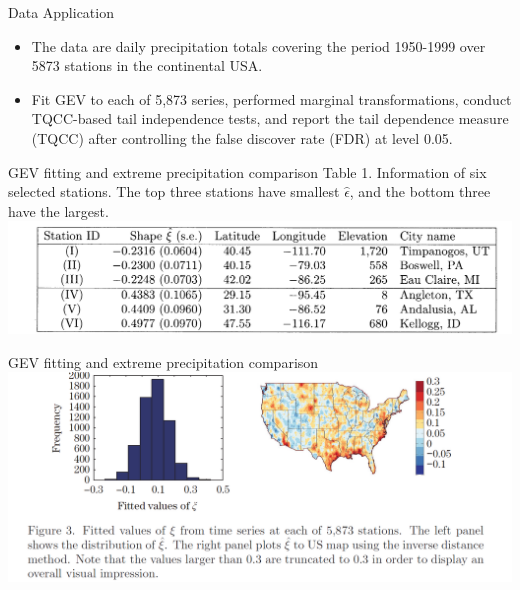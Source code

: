 \documentclass[12pt]{beamer}
\begin{document}
\begin{frame}{Data Application}
\begin{itemize}
\item The data are daily precipitation totals covering the period 1950-1999 over 5873 stations in the continental USA.
\item Fit GEV to each of 5,873 series, performed marginal transformations, conduct TQCC-based tail independence tests, and report the tail dependence measure (TQCC) after controlling the false discover rate (FDR) at level 0.05.
\end{itemize}
\end{frame}

\begin{frame}{GEV fitting and extreme precipitation comparison}
Table 1. Information of six selected stations. The top three stations have smallest $\hat{\epsilon}$, and the bottom three have the largest.
\includegraphics[scale=0.7]{figure1.png}
\end{frame}

\begin{frame}{GEV fitting and extreme precipitation comparison}
\includegraphics[scale=0.7]{figure2.png}
\end{frame}
\end{document}
